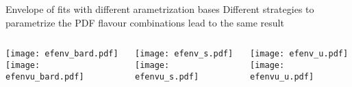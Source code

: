 \begin{frame}{Envelope of fits with different arametrization bases}
    Different strategies to parametrize the PDF flavour combinations lead to the same result
    \vspace*{-1em}
    \begin{columns}
        \begin{column}[T]{0.32\textwidth}
          \begin{center}
              \texttt{[image: efenv\_bard.pdf]} \\
              \texttt{[image: efenvu\_bard.pdf]} 
          \end{center}
        \end{column}
        \begin{column}[t]{0.32\textwidth}
          \begin{center}
              \texttt{[image: efenv\_s.pdf]} \\
              \texttt{[image: efenvu\_s.pdf]} 
          \end{center}
        \end{column}
        \begin{column}[t]{0.32\textwidth}
            \begin{center}
                \texttt{[image: efenv\_u.pdf]} \\
                \texttt{[image: efenvu\_u.pdf]} 
            \end{center}
          \end{column}
    \end{columns}

\end{frame}
